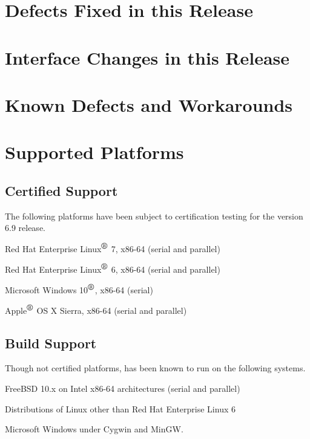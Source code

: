 \documentclass{article}
\begin{document}
\newpage
\section{Defects Fixed in this Release}



\newpage
\section{Interface Changes in this Release}



\newpage
\section{Known Defects and Workarounds}



\newpage
\section{Supported Platforms}
\subsection*{Certified Support}
The following platforms have been subject to certification testing for the
\Xyce{} version 6.9 release.
\begin{XyceItemize}
  \item Red Hat Enterprise Linux${}^{\mbox{\textregistered}}$ 7, x86-64 (serial and parallel)
  \item Red Hat Enterprise Linux${}^{\mbox{\textregistered}}$ 6, x86-64 (serial and parallel)
  \item Microsoft Windows 10${}^{\mbox{\textregistered}}$, x86-64 (serial)
  \item Apple${}^{\mbox{\textregistered}}$ OS X Sierra, x86-64 (serial and parallel)
\end{XyceItemize}

\subsection*{Build Support}
Though not certified platforms, \Xyce{} has been known to run on the following
systems.
\begin{XyceItemize}
  \item FreeBSD 10.x on Intel x86-64 architectures (serial and parallel)
  \item Distributions of Linux other than Red Hat Enterprise Linux 6
  \item Microsoft Windows under Cygwin and MinGW.
\end{XyceItemize}
\end{document}
